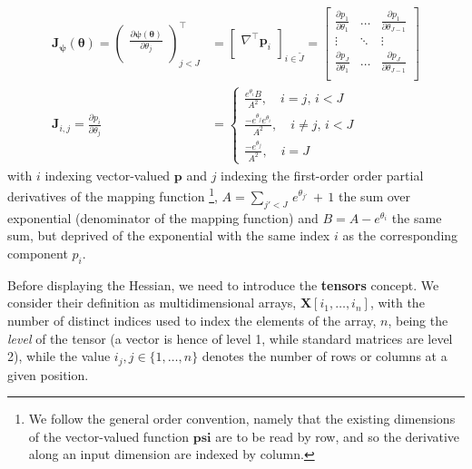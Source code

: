 \documentclass[long, final]{jobim}
\begin{document}
\begin{equation}
\label{eq:mapping-function-gradient}
\begin{aligned}
    \mathbf{J}_{\boldsymbol{\psi}} (\boldsymbol{\theta}) = 
\begin{pmatrix}
\frac{\partial \boldsymbol{\psi}(\boldsymbol{\theta})}{\partial \theta_j} \\
\end{pmatrix}_{j < J }^\top &=
\begin{bmatrix}
\nabla^\top \boldsymbol{p}_i \\
\end{bmatrix}_{i \in \widetilde{J} } = \begin{bmatrix}
\frac{\partial p_1}{\partial \theta_1} & \ldots & \frac{\partial p_1}{\partial \theta_{J-1}}\\
\vdots & \ddots & \vdots \\
\frac{\partial p_J}{\partial \theta_1} & \ldots & \frac{\partial p_J}{\partial \theta_{J-1}}\\
\end{bmatrix}\\  
\mathbf{J}_{i,j} =
   \frac{\partial p_i}{\partial \theta_{j}} &=
\begin{cases}
\frac{e^{\theta_i}B}{A^2 },\quad i = j, \, i < J\\
\frac{-e^{\theta_j}e^{\theta_i}}{A^2 }, \quad i \neq j, \, i < J\\
\frac{-e^{\theta_j}}{A^2}, \quad i=J
\end{cases}
  \end{aligned}
\end{equation}
with $i$ indexing vector-valued $\boldsymbol{p}$ and $j$ indexing the first-order order partial derivatives of the mapping function \footnote{We follow the general order convention, namely that the existing dimensions of the vector-valued function $\boldsymbol{psi}$ are to be read by row, and so the derivative along an input dimension are indexed by column.}, $A=\sum_{j' < J} \,e^{\theta_{j'}} \, +  \, 1$ the sum over exponential (denominator of the mapping function) and $B=A - e^{\theta_{i}}$ the same sum, but deprived of the exponential with the same index $i$ as the corresponding component $p_i$.

Before displaying the Hessian, we need to introduce the \textbf{tensors} concept. We consider their definition as multidimensional arrays, $\boldsymbol{X}[i_1, \ldots, i_n]$,  with the number of distinct indices used to index the elements of the array, $n$, being the \textit{level} of the tensor (a vector is hence of level 1, while standard matrices are level 2), while the value $i_j, j \in \{1, \ldots, n\}$ denotes the number of rows or columns at a given position. 
\end{document}

